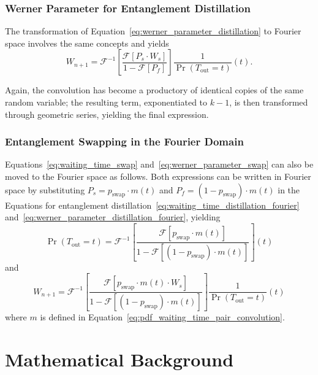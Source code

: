 \documentclass{masterthesis}
\begin{document}
\subsection{Werner Parameter for Entanglement Distillation}

The transformation of Equation~\ref{eq:werner_parameter_distillation} to Fourier space involves the same concepts and yields
\begin{equation}\label{eq:werner_parameter_distillation_fourier}
    W_{n+1} = \mathcal{F}^{-1} \left[ \frac{\mathcal{F}[P_s \cdot W_s]}{1 - \mathcal{F}[P_f]} \right] \frac{1}{\Pr(T_\text{out}=t)}(t) .
\end{equation}

Again, the convolution has become a productory of identical copies of the same random variable; the resulting term, exponentiated to $k-1$, is then transformed through geometric series, yielding the final expression.

\subsection{Entanglement Swapping in the Fourier Domain}

Equations~\ref{eq:waiting_time_swap} and~\ref{eq:werner_parameter_swap} can also be moved to the Fourier space as follows.
Both expressions can be written in Fourier space by substituting $P_s = p_\text{swap} \cdot m(t)$ and $P_f = (1 - p_\text{swap}) \cdot m(t)$ in the Equations for entanglement distillation~\ref{eq:waiting_time_distillation_fourier} and~\ref{eq:werner_parameter_distillation_fourier}, yielding
\begin{equation}
    \Pr(T_{\text{out}} = t) = \mathcal{F}^{-1} \left[ \frac{\mathcal{F}[p_\text{swap} \cdot m(t)]}{1 - \mathcal{F}[(1 - p_\text{swap}) \cdot m(t)]} \right](t)
\end{equation}
and
\begin{equation}
    W_{n+1} = \mathcal{F}^{-1} \left[ \frac{\mathcal{F}[p_\text{swap} \cdot m(t) \cdot W_s]}{1 - \mathcal{F}[(1 - p_\text{swap}) \cdot m(t)]} \right] \frac{1}{\Pr(T_\text{out}=t)}(t)
\end{equation}
where $m$ is defined in Equation~\ref{eq:pdf_waiting_time_pair_convolution}.

\appendix

\chapter{Mathematical Background} %
\end{document}
